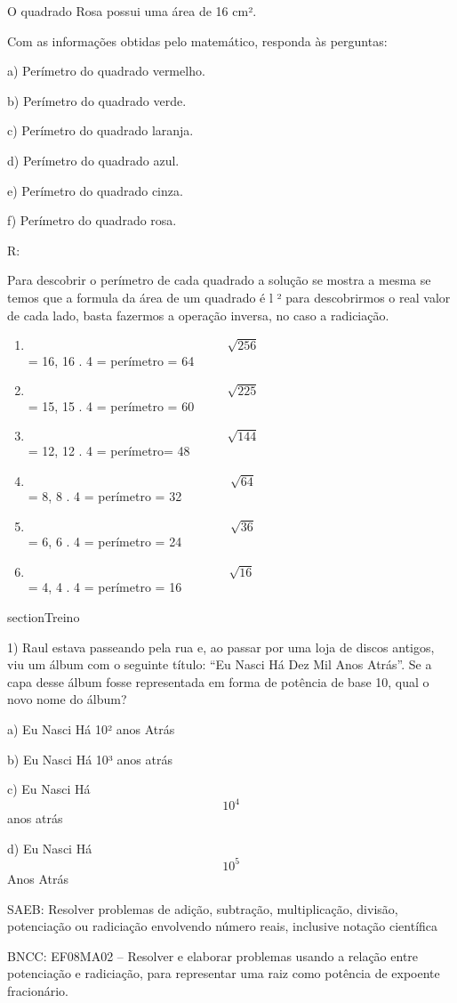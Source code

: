 O quadrado Rosa possui uma área de 16 cm².

Com as informações obtidas pelo matemático, responda às perguntas:

a) Perímetro do quadrado vermelho.

b) Perímetro do quadrado verde.

c) Perímetro do quadrado laranja.

d) Perímetro do quadrado azul.

e) Perímetro do quadrado cinza.

f) Perímetro do quadrado rosa.

R:

Para descobrir o perímetro de cada quadrado a solução se mostra a mesma
se temos que a formula da área de um quadrado é l ² para descobrirmos o
real valor de cada lado, basta fazermos a operação inversa, no caso a
radiciação.

\begin{enumerate}
\def\labelenumi{\alph{enumi})}
\item
  \[\ \sqrt{256}\] = 16, 16 . 4 = perímetro = 64
\item
  \[\ \sqrt{225}\] = 15, 15 . 4 = perímetro = 60
\item
  \[\ \sqrt{144}\] = 12, 12 . 4 = perímetro= 48
\item
  \[\ \sqrt{64}\] = 8, 8 . 4 = perímetro = 32
\item
  \[\ \sqrt{36}\] = 6, 6 . 4 = perímetro = 24
\item
  \[\sqrt{16}\] = 4, 4 . 4 = perímetro = 16
\end{enumerate}

section{Treino}

1) Raul estava passeando pela rua e, ao passar por uma loja de discos
antigos, viu um álbum com o seguinte título: ``Eu Nasci Há Dez Mil Anos
Atrás''. Se a capa desse álbum fosse representada em forma de potência
de base 10, qual o novo nome do álbum?

a) Eu Nasci Há 10² anos Atrás

b) Eu Nasci Há 10³ anos atrás

c) Eu Nasci Há \[10^4\] anos atrás

d) Eu Nasci Há \[10^5\] Anos Atrás

SAEB: Resolver problemas de adição, subtração, multiplicação, divisão,
potenciação ou radiciação envolvendo número reais, inclusive notação
científica

BNCC: EF08MA02 -- Resolver e elaborar problemas usando a relação entre
potenciação e radiciação, para representar uma raiz como potência de
expoente fracionário.


